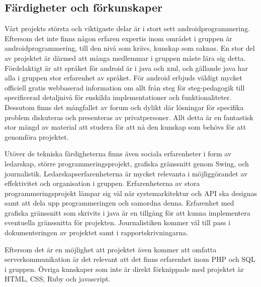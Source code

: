 \subsection{Färdigheter och förkunskaper}
Vårt projekts största och viktigaste delar är i stort sett androidprogrammering. Eftersom det inte finns någon erfaren expertis inom området i gruppen är androidprogrammering, till den nivå som krävs, kunskap som saknas. En stor del av projektet är därmed att många medlemmar i gruppen måste lära sig detta. Fördelaktigt är att språket för android är i java och xml, och gällande java har alla i gruppen stor erfarenhet av språket. För android erbjuds väldigt mycket officiell gratis webbaserad information om allt från steg för steg-pedagogik till specificerad detaljnivå för enskilda implementationer och funktionaliteter. Dessutom finns det mångfallet av forum och dylikt där lösningar för specifika problem diskuteras och presenteras av privatpersoner. Allt detta är en fantastisk stor mängd av material att studera för att nå den kunskap som behövs för att genomföra projektet.

Utöver de tekniska färdigheterna finns även sociala erfarenheter i form av ledarskap, större programmeringsprojekt, grafiska gränssnitt genom Swing, och journalistik.  Ledarskapserfarenheterna är mycket relevanta i möjliggörandet av effektivitet och organisation i gruppen. Erfarenheterna av stora programmeringsprojekt lämpar sig väl när systemarkitektur och API ska designas samt att dela upp programmeringen och samordna denna. Erfarenhet med grafiska gränssnitt som skrivits i java är en tillgång för att kunna implementera eventuella gränssnitta för projekten. Journalistiken kommer väl till pass i dokumenteringen av projektet samt i rapportskrivningarna. 

Eftersom det är en möjlighet att projektet även kommer att omfatta serverkommunikation är det relevant att det finns erfarenhet inom PHP och SQL i gruppen. Övriga kunskaper som inte är direkt förknippade med projektet är HTML, CSS, Ruby och javascript.
